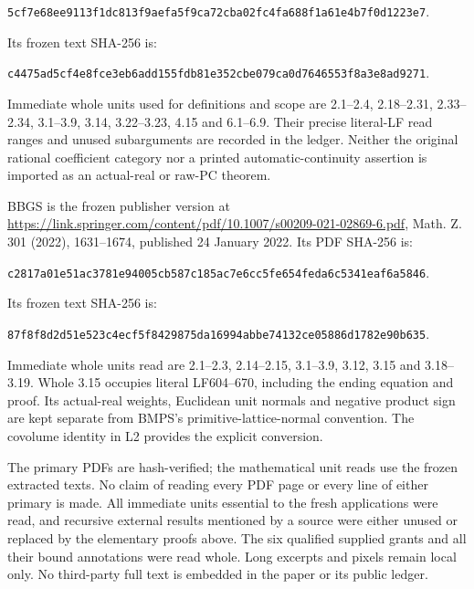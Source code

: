 \documentclass[
  11pt,
]{article}
\begin{document}
\texttt{5cf7e68ee9113f1dc813f9aefa5f9ca72cba02fc4fa688f1a61e4b7f0d1223e7}.

Its frozen text SHA-256 is:

\texttt{c4475ad5cf4e8fce3eb6add155fdb81e352cbe079ca0d7646553f8a3e8ad9271}.

Immediate whole units used for definitions and scope are 2.1--2.4,
2.18--2.31, 2.33--2.34, 3.1--3.9, 3.14, 3.22--3.23, 4.15 and 6.1--6.9.
Their precise literal-LF read ranges and unused subarguments are
recorded in the ledger. Neither the original rational coefficient
category nor a printed automatic-continuity assertion is imported as an
actual-real or raw-PC theorem.

BBGS is the frozen publisher version at
\url{https://link.springer.com/content/pdf/10.1007/s00209-021-02869-6.pdf},
Math. Z. 301 (2022), 1631--1674, published 24 January 2022. Its PDF
SHA-256 is:

\texttt{c2817a01e51ac3781e94005cb587c185ac7e6cc5fe654feda6c5341eaf6a5846}.

Its frozen text SHA-256 is:

\texttt{87f8f8d2d51e523c4ecf5f8429875da16994abbe74132ce05886d1782e90b635}.

Immediate whole units read are 2.1--2.3, 2.14--2.15, 3.1--3.9, 3.12,
3.15 and 3.18--3.19. Whole 3.15 occupies literal LF604--670, including
the ending equation and proof. Its actual-real weights, Euclidean unit
normals and negative product sign are kept separate from BMPS's
primitive-lattice-normal convention. The covolume identity in L2
provides the explicit conversion.

The primary PDFs are hash-verified; the mathematical unit reads use the
frozen extracted texts. No claim of reading every PDF page or every line
of either primary is made. All immediate units essential to the fresh
applications were read, and recursive external results mentioned by a
source were either unused or replaced by the elementary proofs above.
The six qualified supplied grants and all their bound annotations were
read whole. Long excerpts and pixels remain local only. No third-party
full text is embedded in the paper or its public ledger.
\end{document}
